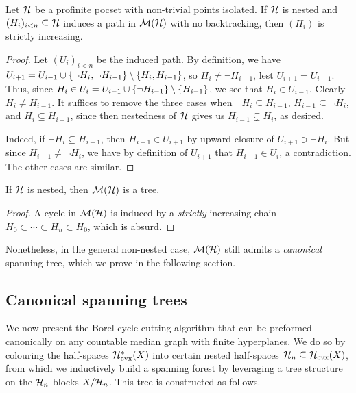 \documentclass[reqno]{amsart}
\begin{document}
    \begin{lemma}
        Let $\mathcal{H}$ be a profinite pocset with non-trivial points isolated. If $\mathcal{H}$ is nested and $(H_i)_{i<n}\subseteq\mathcal{H}$ induces a path in $\mathcal{M}(\mathcal{H})$ with no backtracking, then $(H_i)$ is strictly increasing.
    \end{lemma}
    \begin{proof}
        Let $(U_i)_{i<n}$ be the induced path. By definition, we have $U_{i+1}=U_{i-1}\cup\{\lnot H_i,\lnot H_{i-1}\}\setminus\left\{H_i,H_{i-1}\right\}$, so $H_i\neq\lnot H_{i-1}$, lest $U_{i+1}=U_{i-1}$. Thus, since $H_i\in U_i=U_{i-1}\cup\{\lnot H_{i-1}\}\setminus\left\{H_{i-1}\right\}$, we see that $H_i\in U_{i-1}$. Clearly $H_i\neq H_{i-1}$. It suffices to remove the three cases when $\lnot H_i\subseteq H_{i-1}$, $H_{i-1}\subseteq\lnot H_i$, and $H_i\subseteq H_{i-1}$, since then nestedness of $\mathcal{H}$ gives us $H_{i-1}\subsetneq H_i$, as desired.

        Indeed, if $\lnot H_i\subseteq H_{i-1}$, then $H_{i-1}\in U_{i+1}$ by upward-closure of $U_{i+1}\ni\lnot H_i$. But since $H_{i-1}\neq\lnot H_i$, we have by definition of $U_{i+1}$ that $H_{i-1}\in U_i$, a contradiction. The other cases are similar.
    \end{proof}

    \begin{corollary}\label{cor:nested_implies_tree}
        If $\mathcal{H}$ is nested, then $\mathcal{M}(\mathcal{H})$ is a tree.
    \end{corollary}
    \begin{proof}
        A cycle in $\mathcal{M}(\mathcal{H})$ is induced by a \textit{strictly} increasing chain $H_0\subset\cdots\subset H_n\subset H_0$, which is absurd.
    \end{proof}

    Nonetheless, in the general non-nested case, $\mathcal{M}(\mathcal{H})$ still admits a \textit{canonical} spanning tree, which we prove in the following section.

    \subsection{Canonical spanning trees}\label{sec:cycle_cutting_algorithm}

    We now present the Borel cycle-cutting algorithm that can be preformed canonically on any countable median graph with finite hyperplanes. We do so by colouring the half-spaces $\mathcal{H}^\ast_\mathrm{cvx}(X)$ into certain nested half-spaces $\mathcal{H}_n\subseteq\mathcal{H}_\mathrm{cvx}(X)$, from which we inductively build a spanning forest by leveraging a tree structure on the $\mathcal{H}_n$-blocks $X/\mathcal{H}_n$. This tree is constructed as follows.
\end{document}
